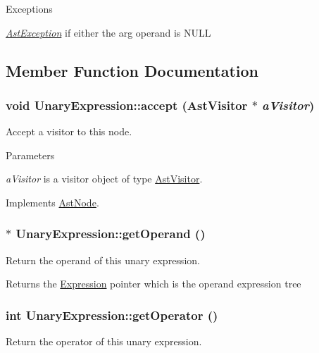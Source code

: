 \begin{DoxyExceptions}{Exceptions}
\item[{\em \hyperlink{classAstException}{AstException}}]if either the arg operand is NULL \end{DoxyExceptions}


\subsection{Member Function Documentation}
\hypertarget{classUnaryExpression_a555e53bb0a187856275b8d2c885b75d0}{
\subsubsection[{accept}]{\setlength{\rightskip}{0pt plus 5cm}void UnaryExpression::accept ({\bf AstVisitor} $\ast$ {\em aVisitor})}}
\label{classUnaryExpression_a555e53bb0a187856275b8d2c885b75d0}
Accept a visitor to this node. 
\begin{DoxyParams}{Parameters}
\item[{\em aVisitor}]is a visitor object of type \hyperlink{classAstVisitor}{AstVisitor}. \end{DoxyParams}


Implements \hyperlink{classAstNode_a67b2d6ce1262da2954fb4db255759fb3}{AstNode}.\hypertarget{classUnaryExpression_aca23f932e421218f5e260f09acd99b51}{
\subsubsection[{getOperand}]{$\ast$ UnaryExpression::getOperand ()}}
\label{classUnaryExpression_aca23f932e421218f5e260f09acd99b51}
Return the operand of this unary expression.

\begin{DoxyReturn}{Returns}
the \hyperlink{classExpression}{Expression} pointer which is the operand expression tree 
\end{DoxyReturn}
\hypertarget{classUnaryExpression_a9818b1b3ddfaa787e321ec28fea399dc}{
\subsubsection[{getOperator}]{\setlength{\rightskip}{0pt plus 5cm}int UnaryExpression::getOperator ()}}
\label{classUnaryExpression_a9818b1b3ddfaa787e321ec28fea399dc}
Return the operator of this unary expression.


